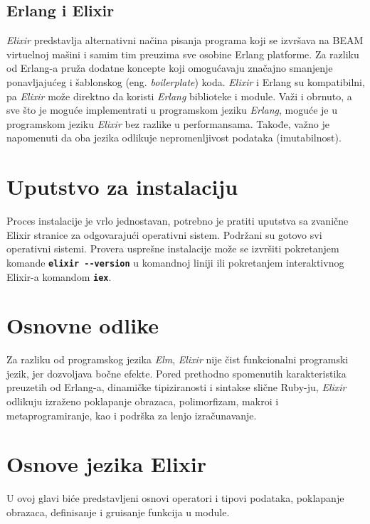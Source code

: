\documentclass[12pt,oneside]{memoir}
\begin{document}
\subsection{Erlang i Elixir}
\emph{Elixir} predstavlja alternativni načina pisanja programa koji se izvršava na BEAM virtuelnoj
mašini i samim tim preuzima sve osobine Erlang platforme. Za razliku od Erlang-a pruža dodatne
koncepte koji omogućavaju značajno smanjenje ponavljajućeg i šablonskog (eng.
\emph{boilerplate}) koda. \emph{Elixir} i Erlang su kompatibilni, pa \emph{Elixir} može direktno da koristi
\emph{Erlang} biblioteke i module. Važi i obrnuto, a sve što je moguće implementrati u programskom jeziku \emph{Erlang},
moguće je u programskom jeziku \emph{Elixir} bez razlike u performansama. Takođe, važno je napomenuti da oba jezika
odlikuje nepromenljivost podataka (imutabilnost).
\section{Uputstvo za instalaciju}
Proces instalacije je vrlo jednostavan, potrebno je pratiti uputstva sa zvanične Elixir
stranice \cite{elixir} za odgovarajući operativni sistem. Podržani su gotovo svi operativni
sistemi. Provera usprešne instalacije može se izvršiti pokretanjem komande
\textbf{\texttt{elixir -{}-version}} u komandnoj liniji ili pokretanjem interaktivnog Elixir-a
komandom \textbf{\texttt{iex}}.
\section{Osnovne odlike}
Za razliku od programskog jezika \emph{Elm}, \emph{Elixir} nije čist funkcionalni programski jezik, jer dozvoljava bočne efekte.
Pored prethodno spomenutih karakteristika preuzetih od Erlang-a, dinamičke tipiziranosti i 
sintakse slične Ruby-ju, \emph{Elixir} odlikuju izraženo poklapanje obrazaca, polimorfizam, makroi
i metaprogramiranje, kao i podrška za lenjo izračunavanje.   
\section{Osnove jezika Elixir}
U ovoj glavi biće predstavljeni osnovi operatori i tipovi podataka, poklapanje obrazaca,
definisanje i gruisanje funkcija u module. 
\end{document}
